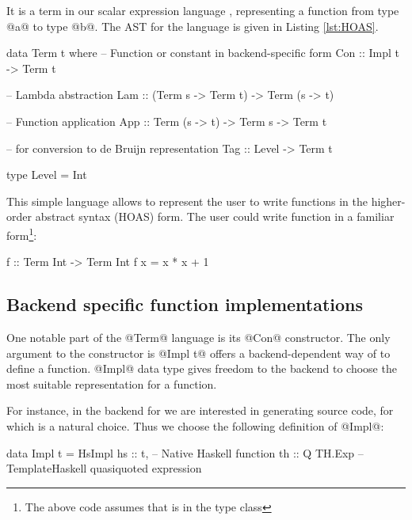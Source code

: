 \documentclass[preamble.tex]{subfiles}
\begin{document}
It is a term in our scalar expression language , representing a function from type @a@ to type @b@. The AST for the  language is given in Listing \ref{lst:HOAS}.

\begin{hscode2}[%
    caption={Term language for HOAS representation.},%
    label=lst:HOAS,%
]
data Term t where
  -- Function or constant in backend-specific form
  Con :: Impl t -> Term t

  -- Lambda abstraction
  Lam :: (Term s -> Term t) -> Term (s -> t)

  -- Function application
  App :: Term (s -> t) -> Term s -> Term t

  -- for conversion to de Bruijn representation
  Tag :: Level -> Term t

type Level = Int
\end{hscode2}

This simple language allows to represent the user to write functions in the higher-order abstract syntax (HOAS) form. The user could write function in a familiar form\footnote{The above code assumes that  is in the type class }:

\begin{hscode}
f :: Term Int -> Term Int
f x = x * x + 1
\end{hscode}



\subsection{Backend specific function implementations}

One notable part of the @Term@ language is its @Con@ constructor. The only argument to the constructor is @Impl t@ offers a backend-dependent way of to define a function. @Impl@ data type gives freedom to the backend to choose the most suitable representation for a function.

For instance, in the \Haskell backend for \LiveFusion we are interested in generating \Haskell source code, for which  \cite{TH} is a natural choice. Thus we choose the following definition of @Impl@:

\begin{hscode}
data Impl t = HsImpl {
                hs :: t,        -- Native Haskell function
                th :: Q TH.Exp  -- TemplateHaskell quasiquoted expression
              } 
\end{hscode}
\end{document}
